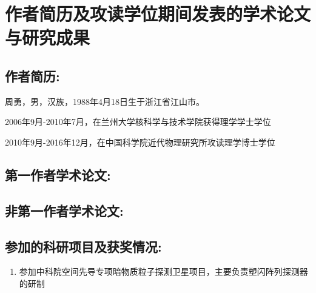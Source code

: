 \chapter*{作者简历及攻读学位期间发表的学术论文与研究成果}

\section*{作者简历:}
周勇，男，汉族，1988年4月18日生于浙江省江山市。

2006年9月-2010年7月，在兰州大学核科学与技术学院获得理学学士学位

2010年9月-2016年12月，在中国科学院近代物理研究所攻读理学博士学位

\section*{第一作者学术论文:}
\begin{refsection}
\nocite{*}

\printbibliography[heading=none,keyword={own-first}]
\end{refsection}

\section*{非第一作者学术论文:}

\begin{refsection}
\nocite{*}
\printbibliography[heading=none,keyword={own-related}]
\end{refsection}

\section*{参加的科研项目及获奖情况:}
\begin{enumerate}
	\item 参加中科院空间先导专项暗物质粒子探测卫星项目，主要负责塑闪阵列探测器的研制
\end{enumerate}